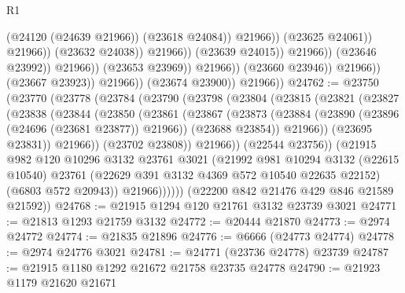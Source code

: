 \begin{lexlean}{R1}
\begin{coremodule}
                                                          (@24120 (@24639 @21966))
                                                          (@23618 @24084))
                                                        @21966))
                                                    (@23625 @24061))
                                                  @21966))
                                              (@23632 @24038))
                                            @21966))
                                        (@23639 @24015))
                                      @21966))
                                  (@23646 @23992))
                                @21966))
                            (@23653 @23969))
                          @21966))
                      (@23660 @23946))
                    @21966))
                (@23667 @23923))
              @21966))
          (@23674 @23900))
        @21966))
@24762 := @23750
    (@23770
      (@23778
        (@23784
          (@23790
            (@23798
              (@23804
                (@23815
                  (@23821
                    (@23827
                      (@23838
                        (@23844
                          (@23850
                            (@23861
                              (@23867
                                (@23873
                                  (@23884
                                    (@23890 (@23896 (@24696 (@23681 @23877)) @21966))
                                    (@23688 @23854))
                                  @21966))
                              (@23695 @23831))
                            @21966))
                        (@23702 @23808))
                      @21966))
                  (@22544 @23756))
                (@21915
                  @982
                  @120
                  @10296
                  @3132
                  @23761
                  @3021
                  (@21992
                    @981
                    @10294
                    @3132
                    (@22615 @10540)
                    @23761
                    (@22629 @391 @3132 @4369 @572 @10540 @22635 @22152)
                    (@6803 @572 @20943))
                  @21966))))))
      (@22200 @842 @21476 @429 @846 @21589 @21592))
@24768 := @21915 @1294 @120 @21761 @3132 @23739 @3021
@24771 := @21813 @1293 @21759 @3132
@24772 := @20444 @21870
@24773 := @2974 @24772
@24774 := @21835 @21896
@24776 := @6666 (@24773 @24774)
@24778 := @2974 @24776 @3021
@24781 := @24771 (@23736 @24778) @23739
@24787 := @21915 @1180 @1292 @21672 @21758 @23735 @24778
@24790 := @21923 @1179 @21620 @21671

\end{coremodule}
\end{lexlean}
